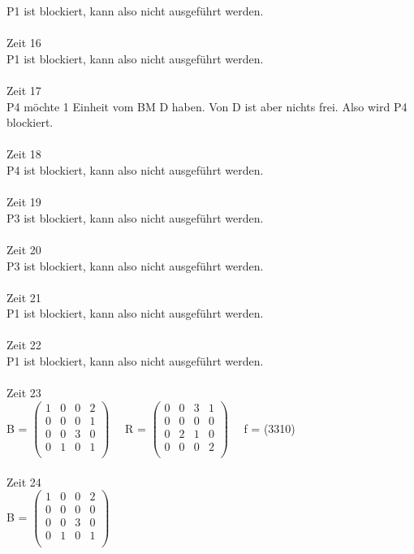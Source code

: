 \documentclass[10pt,a4paper]{scrartcl}
\begin{document}
	P1 ist blockiert, kann also nicht ausgeführt werden.
	\\\\Zeit 16\\
	P1 ist blockiert, kann also nicht ausgeführt werden.
	\\\\Zeit 17\\
	P4 möchte 1 Einheit vom BM D haben. Von D ist aber nichts frei. Also wird P4 blockiert.
	\\\\Zeit 18\\
	P4 ist blockiert, kann also nicht ausgeführt werden.
	\\\\Zeit 19\\
	P3 ist blockiert, kann also nicht ausgeführt werden.
	\\\\Zeit 20\\
	P3 ist blockiert, kann also nicht ausgeführt werden.
	\\\\Zeit 21\\
	P1 ist blockiert, kann also nicht ausgeführt werden.
	\\\\Zeit 22\\
	P1 ist blockiert, kann also nicht ausgeführt werden.
	\\\\Zeit 23\\
	B =
	$\left( \begin{array}{rrrr}
	1 & 0 & 0 & 2 \\
	0 & 0 & 0 & 1 \\
	0 & 0 & 3 & 0 \\
	0 & 1 & 0 & 1 \\
	\end{array}\right) $
	\ \ R =
	$\left( \begin{array}{rrrr}
	0 & 0 & 3 & 1 \\
	0 & 0 & 0 & 0 \\
	0 & 2 & 1 & 0 \\
	0 & 0 & 0 & 2 \\
	\end{array}\right) $ 
	\ \ f = (3310)
	\\\\Zeit 24\\
	B =
	$\left( \begin{array}{rrrr}
	1 & 0 & 0 & 2 \\
	0 & 0 & 0 & 0 \\
	0 & 0 & 3 & 0 \\
	0 & 1 & 0 & 1 \\
	\end{array}\right) $
\end{document}

